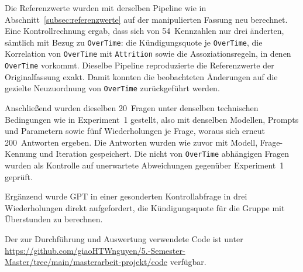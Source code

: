 Die Referenzwerte wurden mit derselben Pipeline wie in Abschnitt~\ref{subsec:referenzwerte} auf der manipulierten Fassung neu berechnet. Eine Kontrollrechnung ergab, dass sich von 54~Kennzahlen nur drei änderten, sämtlich mit Bezug zu \texttt{OverTime}: die Kündigungsquote je \texttt{OverTime}, die Korrelation von \texttt{OverTime} mit \texttt{Attrition} sowie die Assoziationsregeln, in denen \texttt{OverTime} vorkommt. Dieselbe Pipeline reproduzierte die Referenzwerte der Originalfassung exakt. Damit konnten die beobachteten Änderungen auf die gezielte Neuzuordnung von \texttt{OverTime} zurückgeführt werden.

Anschließend wurden dieselben 20~Fragen unter denselben technischen Bedingungen wie in Experiment~1 gestellt, also mit denselben Modellen, Prompts und Parametern sowie fünf Wiederholungen je Frage, woraus sich erneut 200~Antworten ergeben. Die Antworten wurden wie zuvor mit Modell, Frage-Kennung und Iteration gespeichert. Die nicht von \texttt{OverTime} abhängigen Fragen wurden als Kontrolle auf unerwartete Abweichungen gegenüber Experiment~1 geprüft.

Ergänzend wurde GPT in einer gesonderten Kontrollabfrage in drei Wiederholungen direkt aufgefordert, die Kündigungsquote für die Gruppe mit Überstunden zu berechnen.

Der zur Durchführung und Auswertung verwendete Code ist unter \url{https://github.com/giaoHTWnguyen/5.-Semester-Master/tree/main/masterarbeit-projekt/code} verfügbar.